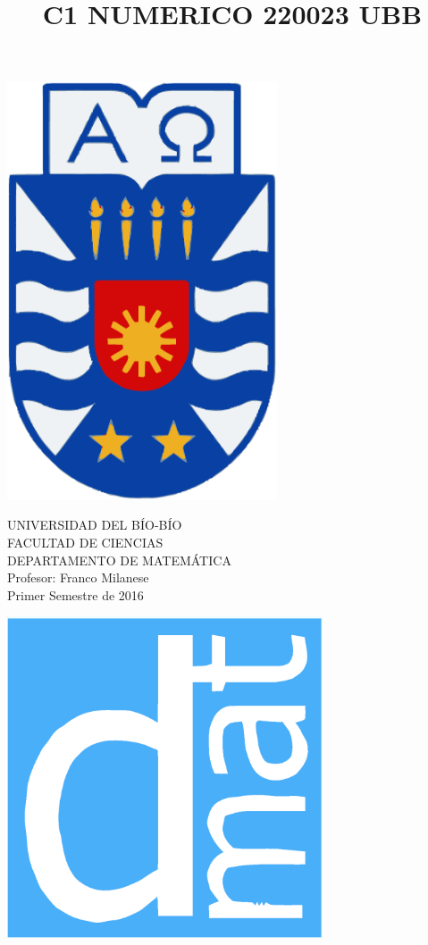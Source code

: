 \documentclass[11pt]{article}
\begin{document}
\title{C1 NUMERICO 220023 UBB}

{\begin{minipage}{2cm}
\hspace*{1cm}\includegraphics[width=0.6\textwidth]{escubo-ubb.eps}
\end{minipage}
\begin{minipage}{12cm}
\small
{\bf \rm 
{
\begin{center}
{\footnotesize UNIVERSIDAD DEL B\'IO-B\'IO} \\
{\scriptsize FACULTAD DE CIENCIAS}  \\
{\scriptsize DEPARTAMENTO DE MATEM\'ATICA}  \\
{\scriptsize Profesor:  Franco Milanese}\\
{\scriptsize Primer Semestre de 2016}
\end{center}
}}
\end{minipage}}
{\begin{minipage}{2cm}
\hspace*{-0.5cm}\vspace*{-0.05cm}\includegraphics[width=0.7\textwidth]{escudo-dmat.eps}
\end{minipage}}
\end{document}
